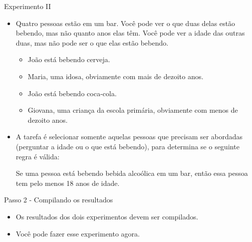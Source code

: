 \documentclass{beamer}
\begin{document}
\begin{frame}{Experimento II}

\begin{itemize}
    \item <1->Quatro pessoas estão em um bar. Você pode ver o que duas delas estão bebendo, mas não quanto anos elas têm. Você pode ver a idade das outras duas, mas não pode ser o que elas estão bebendo.

\begin{itemize}
    \item João está bebendo cerveja.
    \item Maria, uma idosa, obviamente com mais de dezoito anos.
    \item João está bebendo coca-cola.
    \item Giovana, uma criança da escola primária, obviamente com menos de dezoito anos.
\end{itemize}

\item <2->A tarefa é selecionar somente aquelas pessoas que precisam ser abordadas (perguntar a idade ou o que está bebendo), para determina se o seguinte regra é válida:

\begin{center}
Se uma pessoa está bebendo bebida alcoólica em um bar, então essa pessoa tem pelo menos 18 anos de idade.
\end{center}


\end{itemize}


\end{frame}


\begin{frame}{Passo 2 - Compilando os resultados}

\begin{itemize}

\item Os resultados dos dois experimentos devem ser compilados.

\item Você pode fazer esse experimento agora.

\end{itemize}


\end{frame}
\end{document}
